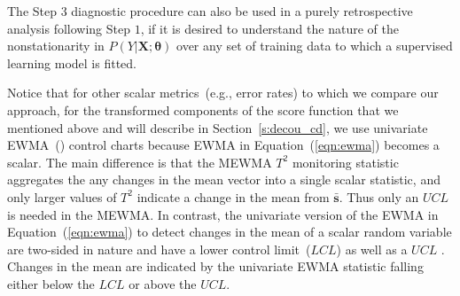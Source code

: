 \documentclass[twoside,11pt]{article}
\begin{document}
The Step $3$ diagnostic procedure can also be used in a purely retrospective analysis following Step $1$, if it is desired to understand the nature of the nonstationarity in $P(Y|\bm{X};\bm{\theta})$ over any set of training data to which a supervised learning model is fitted.
 
Notice that for other scalar metrics~(e.g., error rates) to which we compare our approach, for the transformed components of the score function that we mentioned above and will describe in Section~\ref{s:decou_cd}, we use univariate EWMA~(\cite{roberts1959control}) control charts because EWMA in Equation~(\ref{eqn:ewma}) becomes a scalar. The main difference is that the MEWMA $T^2$ monitoring statistic aggregates the any changes in the mean vector into a single scalar statistic, and only larger values of $T^2$ indicate a change in the mean from $\bar{\bm{s}}$. Thus only an $UCL$ is needed in the MEWMA. In contrast, the univariate version of the EWMA in Equation~(\ref{eqn:ewma}) to detect changes in the mean of a scalar random variable are two-sided in nature and have a lower control limit~($LCL$) as well as a $UCL$ . Changes in the mean are indicated by the univariate EWMA statistic falling either below the $LCL$ or above the $UCL$.

\end{document}
